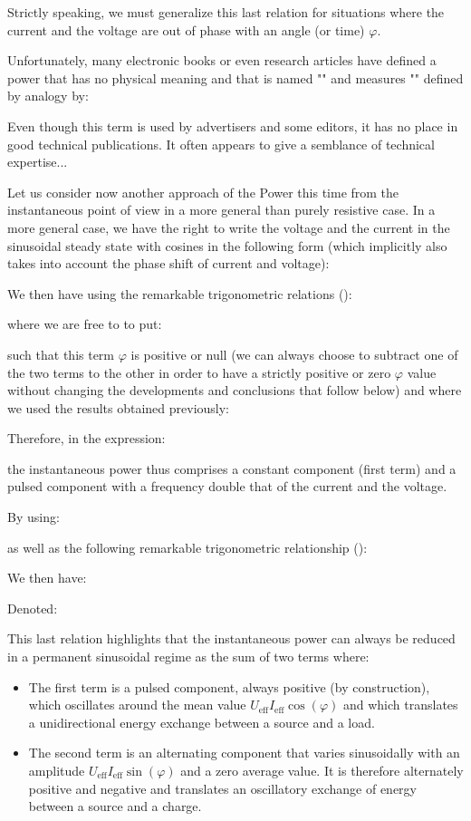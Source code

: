 	Strictly speaking, we must generalize this last relation for situations where the current and the voltage are out of phase with an angle (or time) $\varphi$.
	\begin{tcolorbox}[title=Remark,colframe=black,arc=10pt]
	Unfortunately, many electronic books or even research articles have defined a power that has no physical meaning and that is named "" and measures "" defined by analogy by:
	
	Even though this term is used by advertisers and some editors, it has no place in good technical publications. It often appears to give a semblance of technical expertise...
	\end{tcolorbox}	
	Let us consider now another approach of the Power this time from the instantaneous point of view in a more general than purely resistive case. In a more general case, we have the right to write the voltage and the current in the sinusoidal steady state with cosines in the following form (which implicitly also takes into account the phase shift of current and voltage):
	
	We then have using the remarkable trigonometric relations ():
	
	where we are free to to put:
	
	such that this term $\varphi$ is positive or null (we can always choose to subtract one of the two terms to the other in order to have a strictly positive or zero $\varphi$ value without changing the developments and conclusions that follow below) and where we used the results obtained previously:
	
	Therefore, in the expression:
	
	the instantaneous power thus comprises a constant component (first term) and a pulsed component with a frequency double that of the current and the voltage. 

	By using:
	
	as well as the following remarkable trigonometric relationship ():
	
	We then have:
	
	Denoted:
	
	This last relation highlights that the instantaneous power can always be reduced in a permanent sinusoidal regime as the sum of two terms where:
	\begin{itemize}
		\item The first term is a pulsed component, always positive (by construction), which oscillates around the mean value $U_\text{eff}I_\text{eff}\cos(\varphi)$ and which translates a unidirectional energy exchange between a source and a load.

		\item The second term is an alternating component that varies sinusoidally with an amplitude $U_\text{eff}I_\text{eff}\sin(\varphi)$  and a zero average value. It is therefore alternately positive and negative and translates an oscillatory exchange of energy between a source and a charge.
	\end{itemize}

